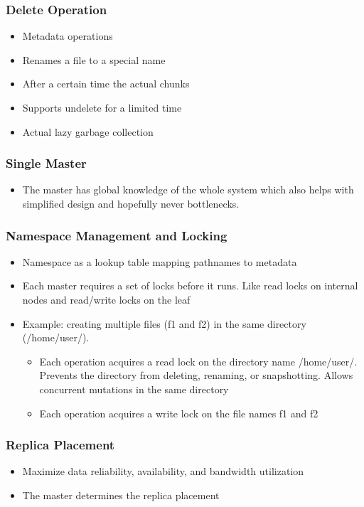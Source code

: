 \documentclass[12pt]{article}
\begin{document}
\subsubsection{Delete Operation}
\begin{itemize}
    \item Metadata operations
    \item Renames a file to a special name
    \item After a certain time the actual chunks
    \item Supports undelete for a limited time
    \item Actual lazy garbage collection
\end{itemize}

\subsubsection{Single Master}
\begin{itemize}
    \item The master has global knowledge of the whole system which also helps with simplified design and hopefully never bottlenecks.
\end{itemize}

\subsubsection{Namespace Management and Locking}
\begin{itemize}
    \item Namespace as a lookup table mapping pathnames to metadata
    \item Each master requires a set of locks before it runs. Like read locks on internal nodes and read/write locks on the leaf
    \item Example: creating multiple files (f1 and f2) in the same directory (/home/user/).
    \begin{itemize}
        \item Each operation acquires a read lock on the directory name /home/user/. Prevents the directory from deleting, renaming, or snapshotting. Allows concurrent mutations in the same directory
        \item Each operation acquires a write lock on the file names f1 and f2
    \end{itemize}
\end{itemize}

\subsubsection{Replica Placement}
\begin{itemize}
    \item Maximize data reliability, availability, and bandwidth utilization
    \item The master determines the replica placement
\end{itemize}
\end{document}
